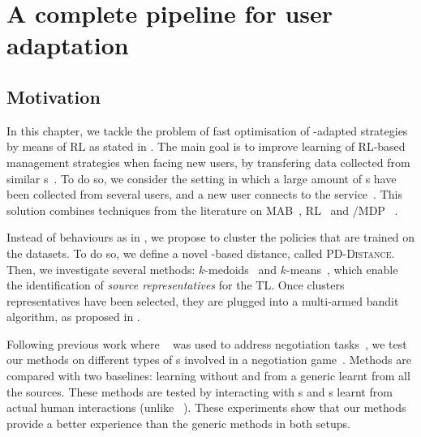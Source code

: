 \chapter{A complete pipeline for user adaptation}
\label{chapter:sigdial}

\section{Motivation}

In this chapter, we tackle the problem  of fast optimisation of -adapted  strategies by means of \acrfull{RL} as stated in  . The main goal is to improve  learning of \gls{RL}-based  management strategies when facing new users, by transfering data collected from similar s~\parencite{Lazaric2008}. To do so, we consider the setting in which a large amount of s have been collected from several users, and a new user connects to the service~\parencite{Genevay2016}. This solution combines techniques from the literature on \gls{MAB}~\parencite{auer2002},  \gls{RL}~\parencite{Ernst05,Lihong09,Chandramohan2010,pietquin2011sample} and /\gls{MDP} ~\parencite{Chandramohan2012,mahmud2013}.

Instead of   behaviours as in \textcite{Chandramohan2012}, we propose to cluster the policies that are trained on the   datasets. To do so, we define a novel -based distance, called \textsc{PD-Distance}. Then, we investigate several  methods: $k$-medoids~\parencite{kmedois} and $k$-means~\parencite{kmeans,macqueen1967some}, which enable the identification of \textit{source representatives} for the \acrfull{TL}. Once clusters representatives have been selected, they are plugged into a multi-armed bandit algorithm, as proposed in \textcite{Genevay2016}.

Following previous work where  ~\parencite{janarthanam2010-tl-dialogue,Ultes2015} was used to address negotiation tasks~\parencite{Sadri2001,Georgila2011,Barlier2015,Genevay2016}, we test our methods on different types of s involved in a negotiation game~\parencite{Laroche2016}. Methods are compared with two baselines: learning without  and  from a generic  learnt from all the sources. These methods are tested by interacting with s and s learnt from actual human interactions (unlike ~\textcite{Genevay2016}). These experiments show that our  methods provide a better  experience than the generic methods in both setups.

